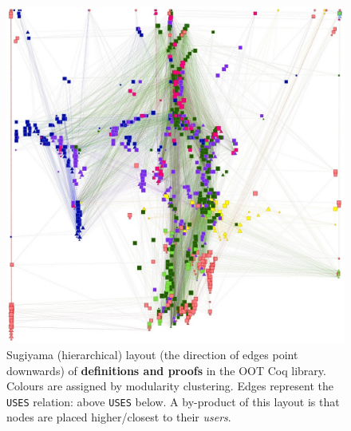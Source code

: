 \begin{figure}[p]
  \begin{minipage}{0.5\textwidth-0.5em}
    \centering
    \includegraphics[width=\textwidth]{img/oot/hierarchical}
    \caption{Sugiyama (hierarchical) layout (the direction of edges point
      downwards) of \textbf{definitions and proofs} in the OOT Coq
      library. Colours are assigned by modularity clustering. Edges represent
      the \texttt{USES} relation: above \texttt{USES} below. A by-product of
      this layout is that nodes are placed higher/closest to their
      \emph{users}.}\label{fig:oot:hier}
  \end{minipage}%
  \hspace{1em}%
  \begin{minipage}{0.5\textwidth-0.5em}
    \centering

\end{minipage}
\end{figure}
